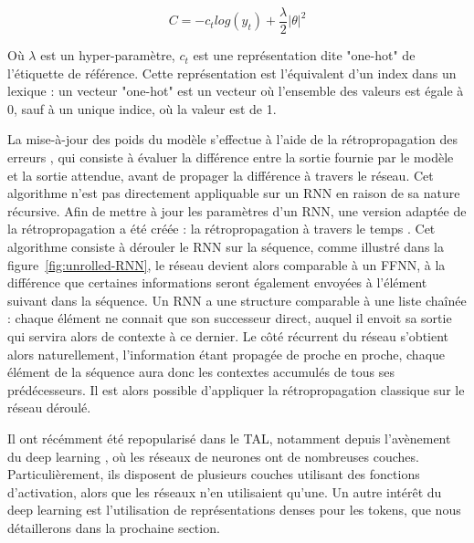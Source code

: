\documentclass[PhD-Yoann-Dupont.tex]{subfiles}
\begin{document}
\begin{equation} \label{eq:cross-entropy}
C = - c_{t} log( y_{t} ) + \frac{\lambda}{2} \left | \theta \right |^{2}
\end{equation}

Où $\lambda$ est un hyper-paramètre, $c_{t}$ est une représentation dite "one-hot" de l'étiquette de référence. Cette représentation est l'équivalent d'un index dans un lexique : un vecteur "one-hot" est un vecteur où l'ensemble des valeurs est égale à 0, sauf à un unique indice, où la valeur est de 1.

La mise-à-jour des poids du modèle s'effectue à l'aide de la rétropropagation des erreurs \citep{linnainmaa1970representation,werbos1982applications,rumelhart1985learning}, qui consiste à évaluer la différence entre la sortie fournie par le modèle et la sortie attendue, avant de propager la différence à travers le réseau. Cet algorithme n'est pas directement appliquable sur un RNN en raison de sa nature récursive. Afin de mettre à jour les paramètres d'un RNN, une version adaptée de la rétropropagation a été créée : la rétropropagation à travers le temps \citep{werbos1990backpropagation}. Cet algorithme consiste à dérouler le RNN sur la séquence, comme illustré dans la figure\ \ref{fig:unrolled-RNN}, le réseau devient alors comparable à un FFNN, à la différence que certaines informations seront également envoyées à l'élément suivant dans la séquence. Un RNN a une structure comparable à une liste chaînée : chaque élément ne connait que son successeur direct, auquel il envoit sa sortie qui servira alors de contexte à ce dernier. Le côté récurrent du réseau s'obtient alors naturellement, l'information étant propagée de proche en proche, chaque élément de la séquence aura donc les contextes accumulés de tous ses prédécesseurs. Il est alors possible d'appliquer la rétropropagation classique sur le réseau déroulé.

Il ont récémment été repopularisé dans le TAL, notamment depuis l'avènement du deep learning \citep{hinton2007learning,bengio2015deep}, où les réseaux de neurones ont de nombreuses couches. Particulièrement, ils disposent de plusieurs couches utilisant des fonctions d'activation, alors que les réseaux n'en utilisaient qu'une. Un autre intérêt du deep learning est l'utilisation de représentations denses pour les tokens, que nous détaillerons dans la prochaine section.
\end{document}
